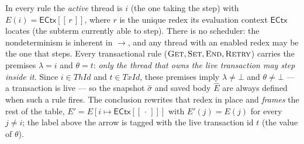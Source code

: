 \documentclass[manuscript,nonacm]{acmart}
\theoremstyle{acmdefinition}
\newcommand{\TrId}{\mathit{TxId}}   %
\newcommand{\ThId}{\mathit{ThId}}   %
\newcommand{\ectx}{\mathsf{ECtx}}
\newcommand{\ehole}[1]{\ectx[[\, #1 \,]]}
\begin{document}
In every rule the \emph{active} thread is $i$ (the one taking the step) with
$E(i)=\ehole{r}$, where $r$ is the unique redex its evaluation context $\ectx$
locates (the subterm currently able to step). There is no scheduler: the
nondeterminism is inherent in $\rightarrow$, and any thread with an enabled redex
may be the one that steps. Every transactional rule
($\textsc{Get},\textsc{Set},\textsc{End},\textsc{Retry}$) carries the premises
$\lambda = i$ and $\theta = t$: \emph{only the thread that owns the live transaction
may step inside it}. Since $i \in \ThId$ and $t \in \TrId$, these premises imply
$\lambda \neq \bot$ and $\theta \neq \bot$ --- a transaction is live --- so the
snapshot $\hat{\sigma}$ and saved body $\hat{E}$ are always defined when such a rule
fires. The conclusion rewrites that redex in place and \emph{frames} the rest of the
table, $E' = E[i \mapsto \ehole{\cdot}]$ with $E'(j) = E(j)$ for every $j \neq i$;
the label above the arrow is tagged with the live transaction id $t$ (the value of
$\theta$).
\end{document}

